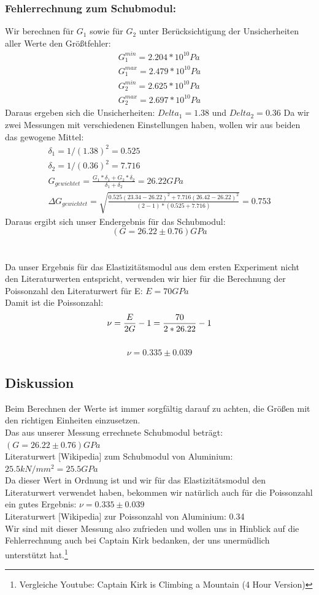 \documentclass{article}
\begin{document}
\subsubsection*{Fehlerrechnung zum Schubmodul:}
Wir berechnen für $G_1$ sowie für $G_2$ unter Berücksichtigung der Unsicherheiten aller Werte den Größtfehler:
\begin{gather*}
G^{min}_1=2.204*10^{10} Pa\\
G^{max}_1=2.479*10^{10} Pa\\
G^{min}_2=2.625*10^{10} Pa\\
G^{max}_2=2.697*10^{10} Pa
\end{gather*}
Daraus ergeben sich die Unsicherheiten: $Delta_1=1.38$ und $Delta_2=0.36$
Da wir zwei Messungen mit verschiedenen Einstellungen haben, wollen wir aus beiden das gewogene Mittel:
\begin{gather*}
\delta_1=1/(1.38)^2=0.525\\
\delta_2=1/(0.36)^2=7.716\\
G_{gewichtet}=\frac{G_1*\delta_1 + G_2*\delta_2}{\delta_1 + \delta_2}=26.22 GPa\\
\Delta G_{gewichtet}=\sqrt{\frac{0.525(23.34-26.22)^2+7.716(26.42-26.22)^2}{(2-1)*(0.525+7.716)}}=0.753
\end{gather*}
Daraus ergibt sich unser Endergebnis für das Schubmodul:\\
$$\boxed{(G=26.22 \pm 0.76) GPa}$$\\
\\
Da unser Ergebnis für das Elastizitätsmodul aus dem ersten Experiment nicht den Literaturwerten entspricht, verwenden wir hier für die Berechnung der Poissonzahl den Literaturwert für E: $E=70GPa$\\
Damit ist die Poissonzahl:\\
$$\nu = \frac{E}{2G} -1  = \frac{70}{2*26.22} -1\\$$\\
$$\boxed{\nu = 0.335 \pm 0.039}$$
\subsection{Diskussion}
Beim Berechnen der Werte ist immer sorgfältig darauf zu achten, die Größen mit den richtigen Einheiten einzusetzen.\\
Das aus unserer Messung errechnete Schubmodul beträgt:\\
$(G=26.22 \pm 0.76) GPa$\\
Literaturwert [Wikipedia] zum Schubmodul von Aluminium: $25.5 kN/mm^2 = 25.5 GPa$\\
Da dieser Wert in Ordnung ist und wir für das Elastizitätsmodul den Literaturwert verwendet haben, bekommen wir natürlich auch für die Poissonzahl ein gutes Ergebnis: $\nu = 0.335 \pm 0.039$\\
Literaturwert [Wikipedia] zur Poissonzahl von Aluminium: 0.34\\
Wir sind mit dieser Messung also zufrieden und wollen uns in Hinblick auf die Fehlerrechnung auch bei Captain Kirk  bedanken, der uns unermüdlich unterstützt hat.\footnote{Vergleiche Youtube: Captain Kirk is Climbing a Mountain (4 Hour Version)}
\newpage
\end{document}
